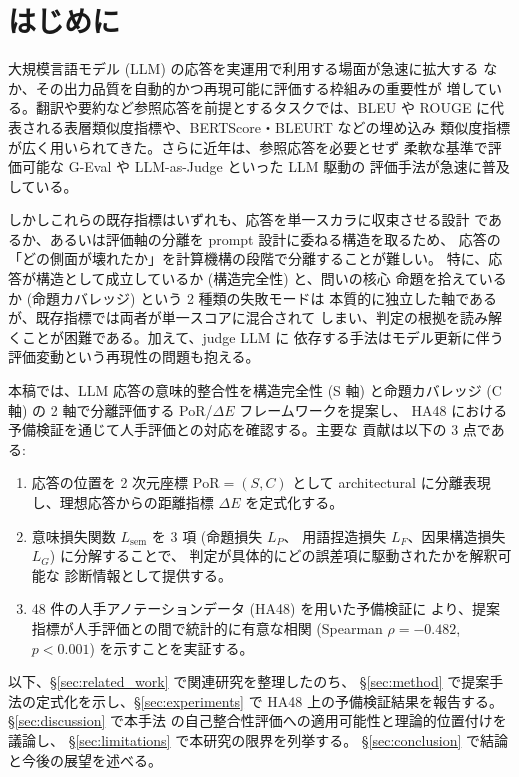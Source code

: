 %

\section{はじめに}
\label{sec:introduction}

大規模言語モデル (LLM) の応答を実運用で利用する場面が急速に拡大する
なか、その出力品質を自動的かつ再現可能に評価する枠組みの重要性が
増している。翻訳や要約など参照応答を前提とするタスクでは、BLEU や
ROUGE に代表される表層類似度指標や、BERTScore・BLEURT などの埋め込み
類似度指標が広く用いられてきた。さらに近年は、参照応答を必要とせず
柔軟な基準で評価可能な G-Eval や LLM-as-Judge といった LLM 駆動の
評価手法が急速に普及している。

しかしこれらの既存指標はいずれも、応答を単一スカラに収束させる設計
であるか、あるいは評価軸の分離を prompt 設計に委ねる構造を取るため、
応答の「どの側面が壊れたか」を計算機構の段階で分離することが難しい。
特に、応答が構造として成立しているか (構造完全性) と、問いの核心
命題を拾えているか (命題カバレッジ) という 2 種類の失敗モードは
本質的に独立した軸であるが、既存指標では両者が単一スコアに混合されて
しまい、判定の根拠を読み解くことが困難である。加えて、judge LLM に
依存する手法はモデル更新に伴う評価変動という再現性の問題も抱える。

本稿では、LLM 応答の意味的整合性を構造完全性 (S 軸) と命題カバレッジ
(C 軸) の 2 軸で分離評価する PoR/$\Delta E$ フレームワークを提案し、
HA48 における予備検証を通じて人手評価との対応を確認する。主要な
貢献は以下の 3 点である:

\begin{enumerate}
  \item 応答の位置を 2 次元座標 $\mathrm{PoR} = (S, C)$ として
        architectural に分離表現し、理想応答からの距離指標
        $\Delta E$ を定式化する。
  \item 意味損失関数 $L_{\mathrm{sem}}$ を 3 項 (命題損失 $L_P$、
        用語捏造損失 $L_F$、因果構造損失 $L_G$) に分解することで、
        判定が具体的にどの誤差項に駆動されたかを解釈可能な
        診断情報として提供する。
  \item 48 件の人手アノテーションデータ (HA48) を用いた予備検証に
        より、提案指標が人手評価との間で統計的に有意な相関
        (Spearman $\rho = -0.482$, $p < 0.001$) を示すことを実証する。
\end{enumerate}

以下、\S\ref{sec:related_work} で関連研究を整理したのち、
\S\ref{sec:method} で提案手法の定式化を示し、\S\ref{sec:experiments}
で HA48 上の予備検証結果を報告する。\S\ref{sec:discussion} で本手法
の自己整合性評価への適用可能性と理論的位置付けを議論し、
\S\ref{sec:limitations} で本研究の限界を列挙する。
\S\ref{sec:conclusion} で結論と今後の展望を述べる。
